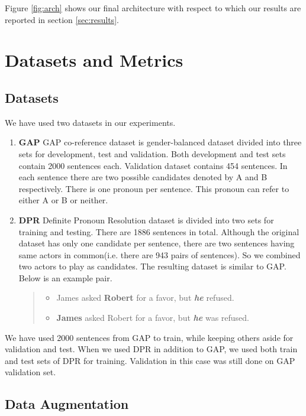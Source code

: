 \documentclass[11pt,a4paper]{article}
\begin{document}
Figure \ref{fig:arch} shows our final architecture with respect to which our results are reported in section \ref{sec:results}.
\section{Datasets and Metrics}

\subsection{Datasets}
\label{subsec:datasets}
We have used two datasets in our experiments.
\begin{enumerate}
\item \textbf{GAP} GAP co-reference dataset \cite{webster2018gap} is gender-balanced dataset divided into three sets for development, test and validation. Both development and test sets contain 2000 sentences each. Validation dataset contains 454 sentences. In each sentence there are two possible candidates denoted by A and B respectively. There is one pronoun per sentence. This pronoun can refer to either A or B or neither. 


\item \textbf{DPR} Definite Pronoun Resolution \cite{rahman2012resolving} dataset is divided into two sets for training and testing. There are 1886 sentences in total. Although the original dataset has only one candidate per sentence, there are two sentences having same actors in common(i.e. there are 943 pairs of sentences). So we combined two actors to play as candidates. The resulting dataset is similar to GAP. Below is an example pair.
  \begin{quote}
    \begin{itemize}
    \item James asked \textbf{Robert} for a favor, but \textit{\textbf{he}} refused.
    \item \textbf{James} asked Robert for a favor, but \textit{\textbf{he}} was refused.
    \end{itemize}
  \end{quote}
\end{enumerate}

We have used 2000 sentences from GAP to train, while keeping others aside for validation and test. When we used DPR in addition to GAP, we used both train and test sets of DPR for training. Validation in this case was still done on GAP validation set.

\subsection{Data Augmentation}
\label{subsec:augment}
\end{document}
